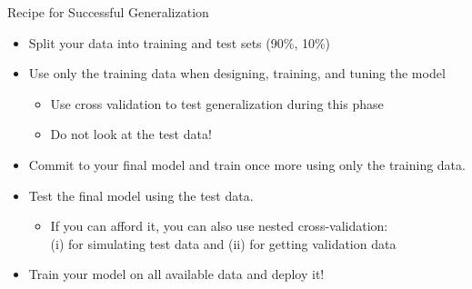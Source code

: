 \documentclass[aspectratio=169]{../latex_main/tntbeamer}  %
\begin{document}
	\begin{frame}[c]{Recipe for Successful Generalization}
	    \begin{itemize}
	        \item Split your data into training and test sets (90\%, 10\%)
	        \item Use only the training data when designing, training, and tuning the model
	        \begin{itemize}
	            \item Use cross validation to test generalization during this phase
	            \item Do not look at the test data!
	        \end{itemize}
	        \item Commit to your final model and train once more using only the training data.
	        \item Test the final model using the test data. 
	        \begin{itemize}
	            \item If you can afford it, you can also use nested cross-validation:\\ (i) for simulating test data and (ii) for getting validation data
	        \end{itemize}
	        \item Train your model on all available data and deploy it!
	    \end{itemize}
	\end{frame}
\end{document}
